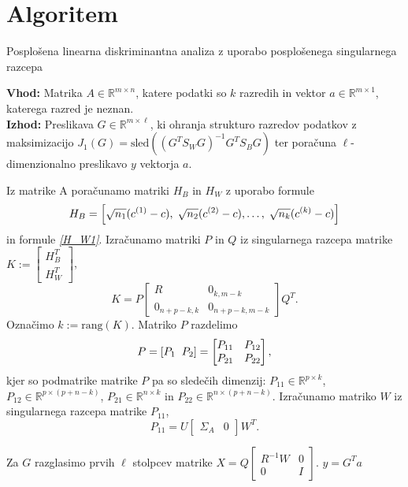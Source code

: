\documentclass[mat1]{article}
\theoremstyle{definition}
\begin{document}
\newpage 
\section{Algoritem}

\begin{algorithm}
\caption{Posplošena linearna diskriminantna analiza z uporabo posplošenega singularnega razcepa}
\hspace*{\algorithmicindent} \textbf{Vhod:} Matrika $A \in \mathbb{R}^{m \times n}$, katere podatki so $k$ razredih in vektor $a \in \mathbb{R}^{m \times 1}$, katerega razred je neznan.
\\
\hspace*{\algorithmicindent} \textbf{Izhod:} Preslikava $G  \in \mathbb{R}^{m \times \ell}$, ki ohranja strukturo razredov podatkov z maksimizacijo $J_1(G) = \text{sled}\left((G^T S_W G)^{-1} G^T S_B G \right)$ ter poračuna $\ell$-dimenzionalno preslikavo $y$ vektorja $a$.
\begin{algorithmic}[1]
    \State Iz matrike A poračunamo matriki $H_B$ in $H_W$ z uporabo formule
      \begin{equation} \label{H_B2}
	H_B = \left[\sqrt{n_1} (c^{(1)} - c), \hspace{1mm} \sqrt{n_2} (c^{(2)} - c),\ldots, \hspace{1mm} \sqrt{n_k} (c^{(k)} - c)\right]
      \end{equation}
      in formule \textit{\eqref{H_W1}}.
    \State Izračunamo matriki $P$ in $Q$ iz singularnega razcepa matrike $K := \begin{bmatrix} H_B^T \\ H_W^T\end{bmatrix}$,
      $$
	K =
        P
	\begin{bmatrix} 
	R & 0_{k, m-k} \\
	0_{n+p-k, k} & 0_{n+p-k, m-k} 
	\end{bmatrix}
	Q^T \text{.} 
      $$
    \State Označimo $k := \text{rang}(K)$.
    \State Matriko $P$ razdelimo 
      $$
	P = \left[P_1 \hspace{2mm} P_2 \right]
		=
	\begin{bmatrix} 
	P_{11} & P_{12} \\
	P_{21} & P_{22} 
	\end{bmatrix},
	$$
	kjer so podmatrike matrike $P$ pa so sledečih dimenzij: $P_{11} \in \mathbb{R}^{p \times k}$, $P_{12} \in 				\mathbb{R}^{p \times (p+n-k)}$, $P_{21} \in \mathbb{R}^{n \times k}$ in $P_{22} \in \mathbb{R}^{n \times (p+n-		k)}$.
    \State Izračunamo matriko $W$ iz singularnega razcepa matrike $P_{11}$,
      $$
	P_{11} =
        U
	\begin{bmatrix} 
	\Sigma_A & 0 
	\end{bmatrix}
	W^T \text{.} 
      $$

    \State Za $G$ razglasimo prvih $\ell$ stolpcev matrike $X = Q
	\begin{bmatrix}
	R^{-1} W & 0 \\
	0 & I 
	\end{bmatrix}$.
    \State $y = G^T a$
  \end{algorithmic}
\end{algorithm}
\end{document}
